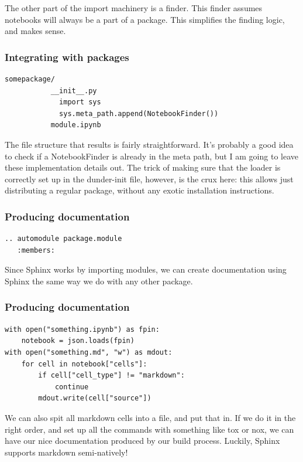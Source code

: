The other part of the import machinery is a finder.
This finder assumes notebooks will always be a part of a package.
This simplifies the finding logic, and makes sense.

\begin{frame}[fragile]
\frametitle{Integrating with packages}

\begin{lstlisting}
somepackage/
           __init__.py
             import sys
             sys.meta_path.append(NotebookFinder())
           module.ipynb
\end{lstlisting}

\end{frame}

The file structure that results is fairly straightforward.
It's probably a good idea to check if a NotebookFinder 
is already in the meta path,
but I am going to leave these implementation details out.
The trick of making sure that the loader is correctly set up
in the dunder-init file,
however,
is the crux here:
this allows just distributing a regular package,
without any exotic installation instructions.

\begin{frame}[fragile]
\frametitle{Producing documentation}

\begin{lstlisting}
.. automodule package.module
   :members:
\end{lstlisting}

\end{frame}

Since Sphinx works by importing modules,
we can create documentation using Sphinx the same
way we do with any other package.

\begin{frame}[fragile]
\frametitle{Producing documentation}

\begin{lstlisting}
with open("something.ipynb") as fpin:
    notebook = json.loads(fpin)
with open("something.md", "w") as mdout:
    for cell in notebook["cells"]:
        if cell["cell_type"] != "markdown":
            continue
        mdout.write(cell["source"])
\end{lstlisting}

\end{frame}

We can also spit all markdown cells into a file,
and put that in.
If we do it in the right order,
and set up all the commands with something like
tox or nox,
we can have our nice documentation produced by our build process.
Luckily,
Sphinx supports markdown semi-natively!


